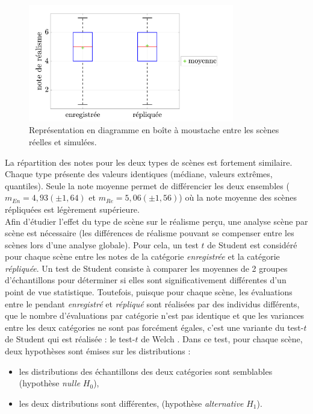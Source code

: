 \begin{figure}[h]
\centering
\includegraphics[width = 0.8\textwidth]{./figures/test_perceptif/testPerceptif_boxplotType.pdf}
\caption{Représentation en diagramme en boîte à moustache entre les scènes réelles et simulées.}\label{fig:ANOVA_scene}
\end{figure}

La répartition des notes pour les deux types de scènes est fortement similaire. Chaque type présente des valeurs identiques (médiane, valeurs extrêmes, quantiles). Seule la note moyenne permet de différencier les deux ensembles ($m_{En} = 4,93 (\pm 1,64)$ et $m_{Re} = 5,06 (\pm 1,56)$) où la note moyenne des scènes répliquées est légèrement supérieure.\\

Afin d'étudier l'effet du type de scène sur le réalisme perçu, une analyse scène par scène est nécessaire (les différences de réalisme pouvant se compenser entre les scènes lors d'une analyse globale). Pour cela, un test $t$ de Student est considéré pour chaque scène entre les notes de la catégorie \textit{enregistrée} et la catégorie \textit{répliquée}. Un test de Student consiste à comparer les moyennes de 2 groupes d'échantillons pour déterminer si elles sont significativement différentes d'un point de vue statistique. Toutefois, puisque pour chaque scène, les évaluations entre le pendant \textit{enregistré} et \textit{répliqué} sont réalisées par des individus différents, que le nombre d'évaluations par catégorie n'est pas identique et que les variances entre les deux catégories ne sont pas forcément égales, c'est une variante du test-$t$ de Student qui est réalisée : le test-$t$ de Welch \cite{ruxton2006unequal}. Dans ce test, pour chaque scène, deux hypothèses sont émises sur les distributions :

\begin{itemize}
\item les distributions des échantillons des deux catégories sont semblables (hypothèse \textit{nulle} $H_0$),
\item les deux distributions sont différentes, (hypothèse \textit{alternative} $H_1$).\\
\end{itemize}

